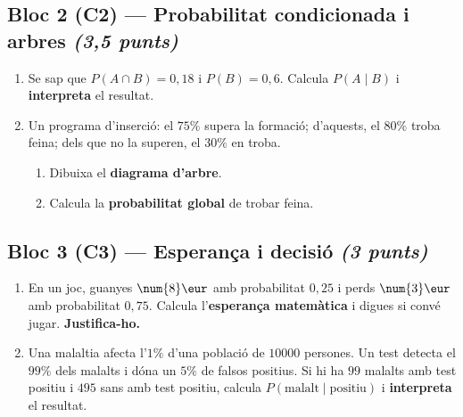 \subsection*{Bloc 2 (C2) — Probabilitat condicionada i arbres \hfill \normalfont\itshape (3,5 punts)}

\begin{enumerate}[label=\textbf{\arabic*.}, leftmargin=2em, itemsep=8pt, start=3]
  \item Se sap que $P(A\cap B)=0,18$ i $P(B)=0,6$. Calcula $P(A\mid B)$ i
        \textbf{interpreta} el resultat.
  \item Un programa d'inserció: el $75\%$ supera la formació; d'aquests, el $80\%$ troba
        feina; dels que no la superen, el $30\%$ en troba.
    \begin{enumerate}[label=\alph*), leftmargin=1.6em, topsep=2pt]
      \item Dibuixa el \textbf{diagrama d'arbre}.
      \item Calcula la \textbf{probabilitat global} de trobar feina.
    \end{enumerate}
\end{enumerate}

\subsection*{Bloc 3 (C3) — Esperança i decisió \hfill \normalfont\itshape (3 punts)}

\begin{enumerate}[label=\textbf{\arabic*.}, leftmargin=2em, itemsep=8pt, start=5]
  \item En un joc, guanyes $\num{8}\eur$ amb probabilitat $0,25$ i perds $\num{3}\eur$
        amb probabilitat $0,75$. Calcula l'\textbf{esperança matemàtica} i digues si
        convé jugar. \textbf{Justifica-ho.}
  \item Una malaltia afecta l'$1\%$ d'una població de $\num{10000}$ persones. Un test
        detecta el $99\%$ dels malalts i dóna un $5\%$ de falsos positius. Si hi ha $99$
        malalts amb test positiu i $495$ sans amb test positiu, calcula
        $P(\text{malalt}\mid\text{positiu})$ i \textbf{interpreta} el resultat.
\end{enumerate}

